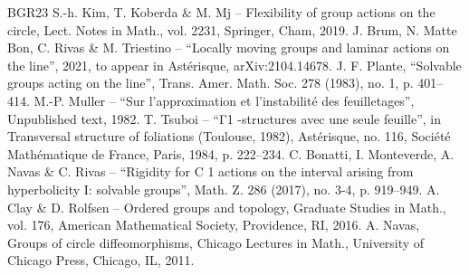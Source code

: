 \documentclass[10pt]{amsart}
\theoremstyle{definition}
\begin{document}
\begin{thebibliography}{BGR23}
 S.-h. Kim, T. Koberda \& M. Mj – Flexibility of group actions on the circle, Lect. Notes in Math., vol. 2231, Springer, Cham, 2019.
 J. Brum, N. Matte Bon, C. Rivas \& M. Triestino – “Locally moving groups and laminar actions on the line”, 2021, to appear in Astérisque, arXiv:2104.14678.
 J. F. Plante, “Solvable groups acting on the line”, Trans. Amer. Math. Soc. 278 (1983), no. 1, p. 401–414.
 M.-P. Muller – “Sur l’approximation et l’instabilité des feuilletages”, Unpublished text, 1982.
 T. Tsuboi – “Γ1 -structures avec une seule feuille”, in Transversal structure of foliations (Toulouse, 1982), Astérisque, no. 116, Société Mathématique de France, Paris, 1984, p. 222–234.
 C. Bonatti, I. Monteverde, A. Navas \& C. Rivas – “Rigidity for C 1 actions on the interval arising from hyperbolicity I: solvable groups”, Math. Z. 286 (2017), no. 3-4, p. 919–949.
 A. Clay \& D. Rolfsen – Ordered groups and topology, Graduate Studies in Math., vol. 176, American Mathematical Society, Providence, RI, 2016.
 A. Navas, Groups of circle diffeomorphisms, Chicago Lectures in Math., University of Chicago Press, Chicago, IL, 2011.
\end{thebibliography}
\end{document}
